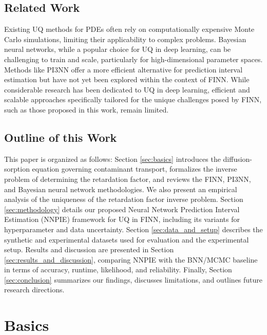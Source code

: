 \section{Related Work}
Existing UQ methods for PDEs often rely on computationally expensive Monte Carlo simulations, limiting their applicability to complex problems. Bayesian neural networks, while a popular choice for UQ in deep learning, can be challenging to train and scale, particularly for high-dimensional parameter spaces. Methods like PI3NN offer a more efficient alternative for prediction interval estimation but have not yet been explored within the context of FINN. While considerable research has been dedicated to UQ in deep learning, efficient and scalable approaches specifically tailored for the unique challenges posed by FINN, such as those proposed in this work, remain limited. %


\section{Outline of this Work}
This paper is organized as follows: Section \vref{sec:basics} introduces the diffusion-sorption equation governing contaminant transport, formalizes the inverse problem of determining the retardation factor, and reviews the FINN, PI3NN, and Bayesian neural network methodologies. We also present an empirical analysis of the uniqueness of the retardation factor inverse problem. Section \vref{sec:methodology} details our proposed Neural Network Prediction Interval Estimation (NNPIE) framework for UQ in FINN, including its variants for hyperparameter and data uncertainty. Section \vref{sec:data_and_setup} describes the synthetic and experimental datasets used for evaluation and the experimental setup. Results and discussion are presented in Section \vref{sec:results_and_discussion}, comparing NNPIE with the BNN/MCMC baseline in terms of accuracy, runtime, likelihood, and reliability. Finally, Section \vref{sec:conclusion} summarizes our findings, discusses limitations, and outlines future research directions.



\chapter{Basics}
\label{sec:basics}

